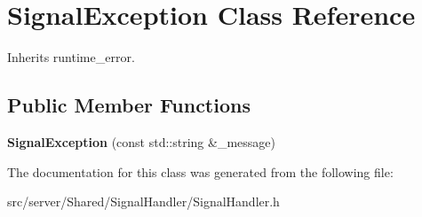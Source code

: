 \hypertarget{class_signal_exception}{\section{Signal\-Exception Class Reference}
\label{class_signal_exception}
}


Inherits runtime\-\_\-error.

\subsection*{Public Member Functions}
\begin{DoxyCompactItemize}
\item 
\hypertarget{class_signal_exception_a5b836a4e5cb2dc450e0757f89646cb28}{{\bfseries Signal\-Exception} (const std\-::string \&\-\_\-message)}\label{class_signal_exception_a5b836a4e5cb2dc450e0757f89646cb28}

\end{DoxyCompactItemize}


The documentation for this class was generated from the following file\-:\begin{DoxyCompactItemize}
\item 
src/server/\-Shared/\-Signal\-Handler/Signal\-Handler.\-h\end{DoxyCompactItemize}
